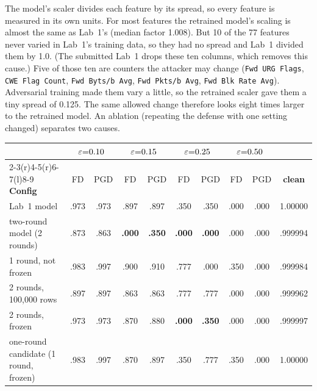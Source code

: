  The model's scaler divides each feature by its spread, so every feature is measured in its own units. For most features the retrained model's scaling is almost the same as Lab~1's (median factor 1.008). But 10 of the 77 features never varied in Lab~1's training data, so they had no spread and Lab~1 divided them by 1.0. (The submitted Lab~1 drops these ten columns, which removes this cause.) Five of those ten are counters the attacker may change (\texttt{Fwd URG Flags}, \texttt{CWE Flag Count}, \texttt{Fwd Byts/b Avg}, \texttt{Fwd Pkts/b Avg}, \texttt{Fwd Blk Rate Avg}). Adversarial training made them vary a little, so the retrained scaler gave them a tiny spread of 0.125. The same allowed change therefore looks eight times larger to the retrained model. An ablation (repeating the defense with one setting changed) separates two causes.

\begin{center}\small
\begin{tabular}{@{}l cccccccc c@{}}
\toprule
& \multicolumn{2}{c}{$\varepsilon{=}0.10$} & \multicolumn{2}{c}{$\varepsilon{=}0.15$}
& \multicolumn{2}{c}{$\varepsilon{=}0.25$} & \multicolumn{2}{c}{$\varepsilon{=}0.50$} \\
\cmidrule(r){2-3}\cmidrule(r){4-5}\cmidrule(r){6-7}\cmidrule(l){8-9}
\textbf{Config} & FD & PGD & FD & PGD & FD & PGD & FD & PGD & \textbf{clean} \\
\midrule
Lab~1 model & .973 & .973 & .897 & .897 & .350 & .350 & .000 & .000 & 1.00000 \\
two-round model (2 rounds) & .873 & .863 & \textbf{.000} & \textbf{.350} & \textbf{.000} & \textbf{.000} & .000 & .000 & .999994 \\
1 round, not frozen & .983 & .997 & .900 & .910 & .777 & .000 & .350 & .000 & .999984 \\
2 rounds, 100{,}000 rows             & .897 & .897 & .863 & .863 & .777 & .777 & .000 & .000 & .999962 \\
2 rounds, frozen & .973 & .973 & .870 & .880 & \textbf{.000} & \textbf{.350} & .000 & .000 & .999997 \\
one-round candidate (1 round, frozen) & .983 & .997 & .870 & .897 & .350 & .777 & .350 & .000 & 1.00000 \\
\bottomrule
\end{tabular}
\end{center}

